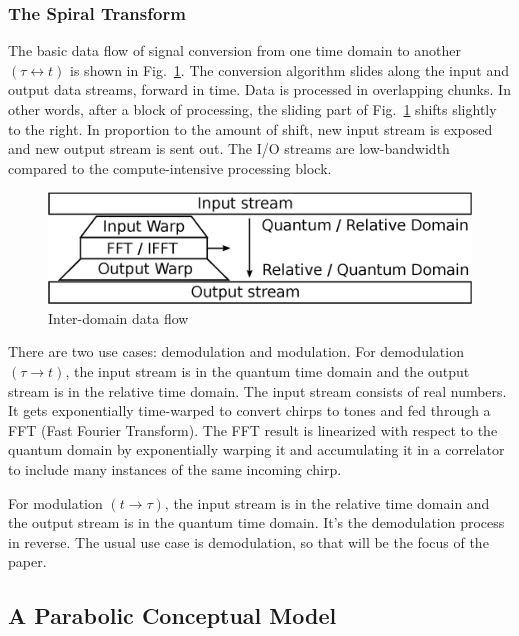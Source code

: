 \subsubsection{\label{sec:level1}The Spiral Transform}

The basic data flow of signal conversion from one time domain to another
$(\tau \leftrightarrow t)$ is shown in Fig.~\ref{fig:sled}.
The conversion algorithm slides along the input and output data streams,
forward in time.
Data is processed in overlapping chunks.
In other words, after a block of processing,
the sliding part of Fig.~\ref{fig:sled} shifts slightly to the right.
In proportion to the amount of shift,
new input stream is exposed and new output stream is sent out.
The I/O streams are low-bandwidth compared to the compute-intensive
processing block.

\begin{figure}
    \centering
    \includegraphics[width=0.95\linewidth]{../source/sled_e}
    \caption[Quantum to Relative Time Translation Flow]{Inter-domain data flow}
    \label{fig:sled}
\end{figure}

There are two use cases: demodulation and modulation.
For demodulation $(\tau \rightarrow t)$, the input stream is in the quantum
time domain and the output stream is in the relative time domain.
The input stream consists of real numbers. It gets exponentially time-warped
to convert chirps to tones and fed through a FFT (Fast Fourier Transform).
The FFT result is linearized with respect to the quantum domain by exponentially
warping it and accumulating it in a correlator to
include many instances of the same incoming chirp.

For modulation $(t \rightarrow \tau)$, the input stream is in the relative time
domain and the output stream is in the quantum time domain.
It's the demodulation process in reverse.
The usual use case is demodulation, so that will be the focus of the paper.

\subsection{A Parabolic Conceptual Model}

